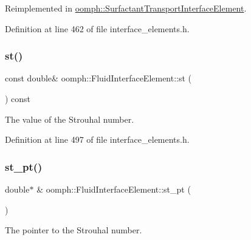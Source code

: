 Reimplemented in \hyperlink{classoomph_1_1SurfactantTransportInterfaceElement_a1710057c610ccccc06ef41f34f086aae}{oomph\+::\+Surfactant\+Transport\+Interface\+Element}.



Definition at line 462 of file interface\+\_\+elements.\+h.

\mbox{\label{classoomph_1_1FluidInterfaceElement_a0c55c0e3cff597363ecb9ab0869c0015}} 
\subsubsection{\texorpdfstring{st()}{st()}}
{\footnotesize\ttfamily const double\& oomph\+::\+Fluid\+Interface\+Element\+::st (\begin{DoxyParamCaption}{ }\end{DoxyParamCaption}) const\hspace{0.3cm}{\ttfamily [inline]}}



The value of the Strouhal number. 



Definition at line 497 of file interface\+\_\+elements.\+h.

\mbox{\label{classoomph_1_1FluidInterfaceElement_a3fa462bb0ff807cf655ba02b35c1ccb4}} 
\subsubsection{\texorpdfstring{st\+\_\+pt()}{st\_pt()}}
{\footnotesize\ttfamily double$\ast$ \& oomph\+::\+Fluid\+Interface\+Element\+::st\+\_\+pt (\begin{DoxyParamCaption}{ }\end{DoxyParamCaption})\hspace{0.3cm}{\ttfamily [inline]}}



The pointer to the Strouhal number. 



